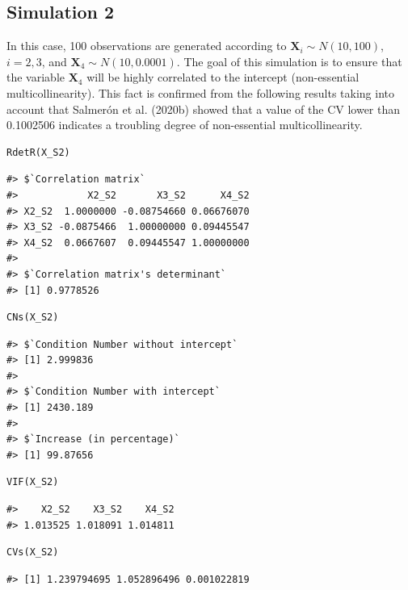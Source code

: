 \hypertarget{simulation-2}{%
\subsection{Simulation 2}\label{simulation-2}}

In this case, 100 observations are generated according to \(\mathbf{X}_{i} \sim N(10, 100)\), \(i=2,3\), and \(\mathbf{X}_{4} \sim N(10, 0.0001)\). The goal of this simulation is to ensure that the variable \(\mathbf{X}_{4}\) will be highly correlated to the intercept (non-essential multicollinearity). This fact is confirmed from the following results taking into account that Salmerón et al. (2020b) showed that a value of the CV lower than 0.1002506 indicates a troubling degree of non-essential multicollinearity.

\begin{verbatim}
RdetR(X_S2)
\end{verbatim}

\begin{verbatim}
#> $`Correlation matrix`
#>            X2_S2       X3_S2      X4_S2
#> X2_S2  1.0000000 -0.08754660 0.06676070
#> X3_S2 -0.0875466  1.00000000 0.09445547
#> X4_S2  0.0667607  0.09445547 1.00000000
#> 
#> $`Correlation matrix's determinant`
#> [1] 0.9778526
\end{verbatim}

\begin{verbatim}
CNs(X_S2)
\end{verbatim}

\begin{verbatim}
#> $`Condition Number without intercept`
#> [1] 2.999836
#> 
#> $`Condition Number with intercept`
#> [1] 2430.189
#> 
#> $`Increase (in percentage)`
#> [1] 99.87656
\end{verbatim}

\begin{verbatim}
VIF(X_S2)
\end{verbatim}

\begin{verbatim}
#>    X2_S2    X3_S2    X4_S2 
#> 1.013525 1.018091 1.014811
\end{verbatim}

\begin{verbatim}
CVs(X_S2)
\end{verbatim}

\begin{verbatim}
#> [1] 1.239794695 1.052896496 0.001022819
\end{verbatim}

